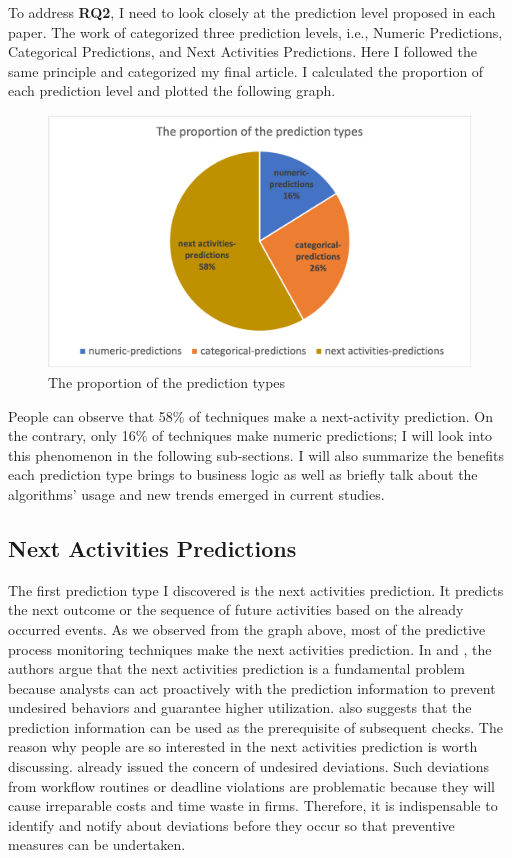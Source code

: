\documentclass[runningheads]{llncs}
\begin{document}
		To address \textbf{RQ2}, I need to look closely at the prediction level proposed in each paper. The work of \cite{original} categorized three prediction levels, i.e., Numeric Predictions,   Categorical Predictions, and Next Activities Predictions. Here I followed the same principle and categorized my final article. I calculated the proportion of each prediction level and plotted the following graph.
		
		
		\begin{figure}
		\includegraphics[scale=0.5]{proportion_prediction.png}
		\centering
		\caption{The proportion of the prediction types}
		\end{figure}
		
		People can observe that 58\% of techniques make a next-activity prediction. On the contrary, only 16\% of techniques make numeric predictions; I will look into this phenomenon in the following sub-sections. I will also summarize the benefits each prediction type brings to business logic as well as briefly talk about the algorithms' usage and new trends emerged in current studies.
		
		\subsection{Next Activities Predictions}
		The first prediction type I discovered is the next activities prediction. It predicts the next outcome or the sequence of future activities based on the already occurred events\cite{original}. As we observed from the graph above, most of the predictive process monitoring techniques make the next activities prediction. In \cite{art-5} and \cite{art-24}, the authors argue that the next activities prediction is a fundamental problem because analysts can act proactively with the prediction information to prevent undesired behaviors and guarantee higher utilization. \cite{art-18} also suggests that the prediction information can be used as the prerequisite of subsequent checks. The reason why people are so interested in the next activities prediction is worth discussing. \cite{art-7} already issued the concern of undesired deviations. Such deviations from workflow routines or deadline violations are problematic because they will cause irreparable costs and time waste in firms. Therefore, it is indispensable to identify and notify about deviations before they occur so that preventive measures can be undertaken. 
		
\end{document}
